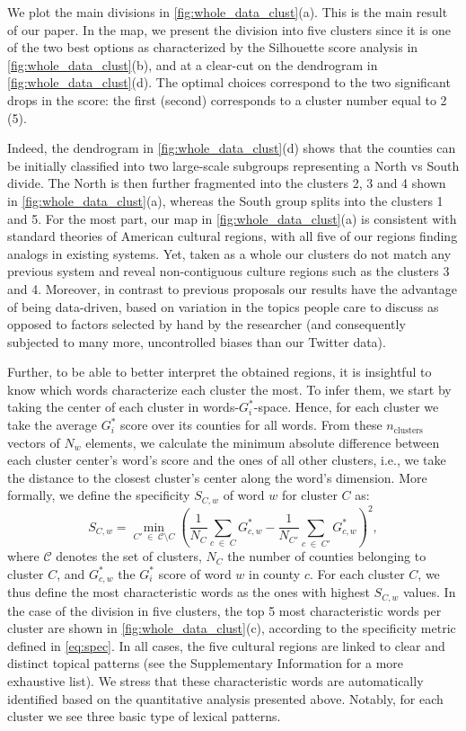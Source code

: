\documentclass[../thesis.tex]{subfiles}
\begin{document}
We plot the main divisions in \cref{fig:whole_data_clust}(a). This is the main result of
our paper. In the map, we present the division into five clusters since it is one of the
two best options as characterized by the Silhouette score analysis in
\cref{fig:whole_data_clust}(b), and at a clear-cut on the dendrogram in
\cref{fig:whole_data_clust}(d). The optimal choices correspond to the two significant
drops in the score: the first (second) corresponds to a cluster number equal to 2 (5). 

Indeed, the dendrogram in \cref{fig:whole_data_clust}(d) shows that the counties can be
initially classified into two large-scale subgroups representing a North vs South
divide. The North is then further fragmented into the clusters 2, 3 and 4 shown in
\cref{fig:whole_data_clust}(a), whereas the South group splits into the clusters 1 and
5. For the most part, our map in \cref{fig:whole_data_clust}(a) is consistent with
standard theories of American cultural regions, with all five of our regions finding
analogs in existing systems. Yet, taken as a whole our clusters do not match any
previous system and reveal non-contiguous culture regions such as the clusters 3 and 4.
Moreover, in contrast to previous proposals our results have the advantage of being
data-driven, based on variation in the topics people care to discuss as opposed to
factors selected by hand by the researcher (and consequently subjected to many more,
uncontrolled biases than our Twitter data).

Further, to be able to better interpret the obtained regions, it is insightful to know
which words characterize each cluster the most. To infer them, we start by taking the
center of each cluster in words-$G_i^*$-space. Hence, for each cluster we take the
average $G_i^*$ score over its counties for all words. From these $n_{\text{clusters}}$
vectors of $N_w$ elements, we calculate the minimum absolute difference between each
cluster center's word's score and the ones of all other clusters, i.e., we take the
distance to the closest cluster's center along the word's dimension. More formally, we
define the specificity $S_{C, w}$ of word $w$ for cluster $C$ as:
\begin{equation}
\label{eq:spec}
  S_{C, w} = \min_{C' \; \in \; \mathcal{C} \setminus C} \left(
  \frac{1}{N_C} \sum_{c \; \in \; C} G_{c, w}^*
    - \frac{1}{N_{C'}} \sum_{c \; \in \; C'} G_{c, w}^*
  \right)^2 ,
\end{equation}
where $\mathcal{C}$ denotes the set of clusters, $N_C$ the number of counties belonging
to cluster $C$, and $G_{c, w}^*$ the $G_i^*$ score of word $w$ in county $c$. For each
cluster $C$, we thus define the most characteristic words as the ones with highest
$S_{C, w}$ values. In the case of the division in five clusters, the top 5 most
characteristic words per cluster are shown in \cref{fig:whole_data_clust}(c), according
to the specificity metric defined in \cref{eq:spec}. In all cases, the five cultural
regions are linked to clear and distinct topical patterns (see the Supplementary
Information for a more exhaustive list). We stress that these characteristic words are
automatically identified based on the quantitative analysis presented above. Notably,
for each cluster we see three basic type of lexical patterns. 
\end{document}
